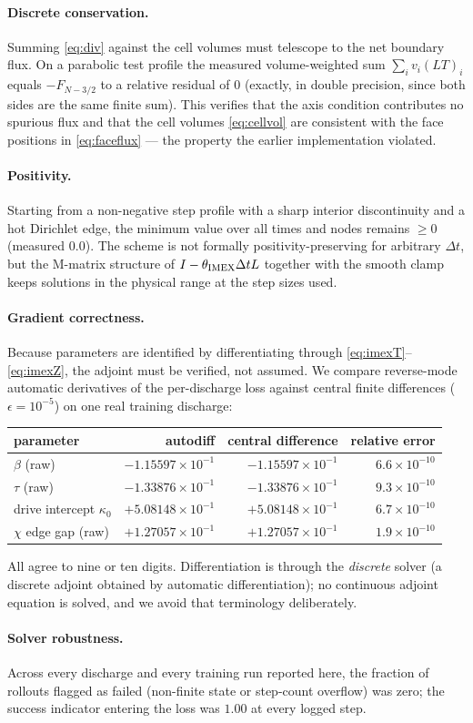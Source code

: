 \paragraph{Discrete conservation.} Summing \eqref{eq:div} against the cell
volumes must telescope to the net boundary flux. On a parabolic test
profile the measured volume-weighted sum
$\sum_i v_i (LT)_i$ equals $-F_{N-3/2}$ to a relative residual of
$0$ (exactly, in double precision, since both sides are the same finite
sum). This verifies that the axis condition contributes no spurious flux
and that the cell volumes \eqref{eq:cellvol} are consistent with the face
positions in \eqref{eq:faceflux} --- the property the earlier
implementation violated.

\paragraph{Positivity.} Starting from a non-negative step profile with a
sharp interior discontinuity and a hot Dirichlet edge, the minimum value
over all times and nodes remains $\ge 0$ (measured $0.0$). The scheme is
not formally positivity-preserving for arbitrary $\Delta t$, but the
M-matrix structure of $I - \theta_{\mathrm{IMEX}}\Delta t L$ together with the smooth
clamp keeps solutions in the physical range at the step sizes used.

\paragraph{Gradient correctness.} Because parameters are identified by
differentiating through \eqref{eq:imexT}--\eqref{eq:imexZ}, the adjoint
must be verified, not assumed. We compare reverse-mode automatic
derivatives of the per-discharge loss against central finite differences
($\epsilon = 10^{-5}$) on one real training discharge:
\begin{center}
\begin{tabular}{lrrr}
\toprule
parameter & autodiff & central difference & relative error \\
\midrule
$\beta$ (raw)               & $-1.15597\times10^{-1}$ & $-1.15597\times10^{-1}$ & $6.6\times10^{-10}$ \\
$\tau$ (raw)                & $-1.33876\times10^{-1}$ & $-1.33876\times10^{-1}$ & $9.3\times10^{-10}$ \\
drive intercept $\kappa_0$  & $+5.08148\times10^{-1}$ & $+5.08148\times10^{-1}$ & $6.7\times10^{-10}$ \\
$\chi$ edge gap (raw)       & $+1.27057\times10^{-1}$ & $+1.27057\times10^{-1}$ & $1.9\times10^{-10}$ \\
\bottomrule
\end{tabular}
\end{center}
All agree to nine or ten digits. Differentiation is through the
\emph{discrete} solver (a discrete adjoint obtained by automatic
differentiation); no continuous adjoint equation is solved, and we avoid
that terminology deliberately.

\paragraph{Solver robustness.} Across every discharge and every training
run reported here, the fraction of rollouts flagged as failed (non-finite
state or step-count overflow) was zero; the success indicator entering the
loss was $1.00$ at every logged step.
